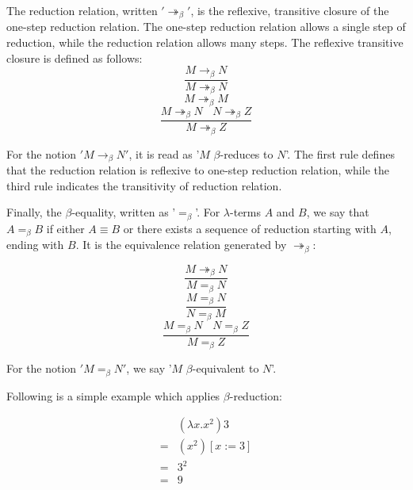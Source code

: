 \noindent The reduction relation, written $'\twoheadrightarrow _\beta'$, is the reflexive, transitive closure of the one-step reduction relation. The one-step reduction relation allows a single step of reduction, while the reduction relation allows many steps. The reflexive transitive closure is defined as follows:
\begin{equation*}
\frac{M\rightarrow _\beta N}{M \twoheadrightarrow _\beta N}
\end{equation*}
\begin{equation*}
M \twoheadrightarrow _\beta M
\end{equation*}
\begin{equation*}
\frac{M\twoheadrightarrow _\beta N\ \ \ \ N\twoheadrightarrow _\beta Z}{M \twoheadrightarrow _\beta Z}
\end{equation*}

For the notion $'M\rightarrow _\beta N'$, it is read as '$M$ $\beta$-reduces to $N$'. The first rule defines that the reduction relation is reflexive to one-step reduction relation, while the third rule indicates the transitivity of reduction relation.

\noindent Finally, the $\beta$-equality, written as '$=_\beta$'. For $\lambda$-terms $A$ and $B$, we say that $A =_\beta B$ if either $A \equiv B$ or there exists a sequence of reduction starting with $A$, ending with $B$. It is the equivalence relation generated by $\twoheadrightarrow _\beta$:

\begin{equation*}
\frac{M\twoheadrightarrow _\beta N}{M = _\beta N}
\end{equation*}
\begin{equation*}
\frac{M = _\beta N}{N = _\beta M}
\end{equation*}
\begin{equation*}
\frac{M = _\beta N\ \ \ \ N = _\beta Z}{M = _\beta Z}
\end{equation*}

For the notion $'M = _\beta N'$, we say '$M$ $\beta$-equivalent to $N$'. 

\noindent Following is a simple example which applies $\beta$-reduction:

\begin{equation*}
\begin{array}{ll}
&(\lambda x.x^2)3\\
=& (x^2)[x:=3] \\
=& 3^2 \\
=&9 \\
\end{array}
\end{equation*}


